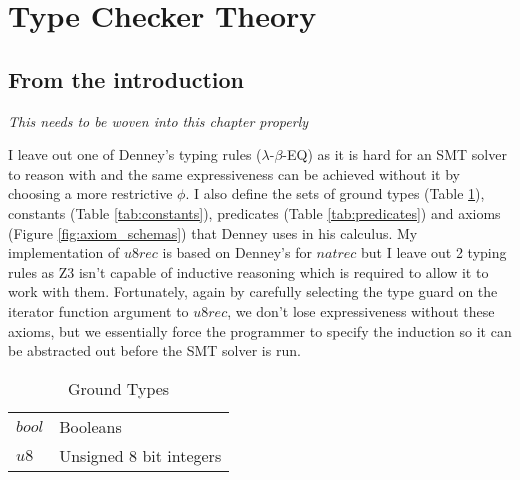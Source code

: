 \section{Type Checker Theory}

\subsection{From the introduction}

\textit{This needs to be woven into this chapter properly}

I leave out one of Denney's typing rules ($\lambda$-$\beta$-EQ) as it is hard for an SMT solver to reason with and
the same expressiveness can be achieved without it by choosing a more restrictive $\phi$.
I also define the sets of ground types (Table \ref{tab:ground_types}), constants (Table \ref{tab:constants}),
predicates (Table \ref{tab:predicates}) and axioms (Figure \ref{fig:axiom_schemas}) that Denney uses in his
calculus.
My implementation of $u8rec$ is based on Denney's for $natrec$ but I leave out 2 typing rules as Z3 isn't
capable of inductive reasoning which is required to allow it to work with them.
Fortunately, again by carefully selecting the type guard on the iterator function argument to $u8rec$,
we don't lose expressiveness without these axioms, but we essentially force the programmer to specify the
induction so it can be abstracted out before the SMT solver is run.

\begin{table}
    \centering
    \begin{tabular}{|l|l|}
        \cline{1-2}
        $bool$ & Booleans\\\cline{1-2}
        $u8$ & Unsigned 8 bit integers\\\cline{1-2}
    \end{tabular}
    \caption{Ground Types}
    \label{tab:ground_types}
\end{table}

